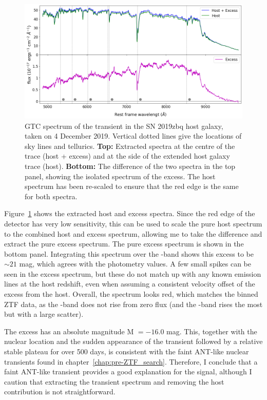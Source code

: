 \documentclass[a4paper,oneside,12pt, class=Latex/Classes/PhDthesisPSnPDF, crop=false]{standalone}
\begin{document}
\begin{figure}
    \centering
    \includegraphics[width=\textwidth]{../Images/chapter_5/2020zbq_spec.png}
    \caption[GTC spectrum of the late-time transient in the SN 2019zbq host galaxy.]{GTC spectrum of the transient in the SN 2019zbq host galaxy, taken on 4 December 2019. Vertical dotted lines give the locations of sky lines and tellurics. \textbf{Top:} Extracted spectra at the centre of the trace (host + excess) and at the side of the extended host galaxy trace (host). \textbf{Bottom:} The difference of the two spectra in the top panel, showing the isolated spectrum of the excess. The host spectrum has been re-scaled to ensure that the red edge is the same for both spectra.}
    \label{2019zbq_spec}
\end{figure}

Figure~\ref{2019zbq_spec} shows the extracted host and excess spectra. Since the red edge of the detector has very low sensitivity, this can be used to scale the pure host spectrum to the combined host and excess spectrum, allowing me to take the difference and extract the pure excess spectrum. The pure excess spectrum is shown in the bottom panel. Integrating this spectrum over the \ztfr-band shows this excess to be $\sim21$ mag, which agrees with the photometry values. A few small spikes can be seen in the excess spectrum, but these do not match up with any known emission lines at the host redshift, even when assuming a consistent velocity offset of the excess from the host. Overall, the spectrum looks red, which matches the binned ZTF data, as the \ztfg-band does not rise from zero flux (and the \ztfi-band rises the most but with a large scatter).

The excess has an absolute magnitude M $=-16.0$ mag. This, together with the nuclear location and the sudden appearance of the transient followed by a relative stable plateau for over 500 days, is consistent with the faint ANT-like nuclear transients found in chapter~\ref{chap:pre-ZTF_search}. Therefore, I conclude that a faint ANT-like transient provides a good explanation for the signal, although I caution that extracting the transient spectrum and removing the host contribution is not straightforward.
\end{document}
